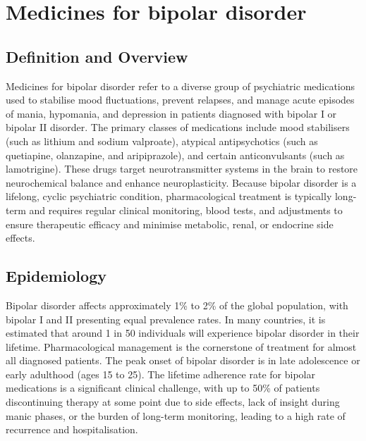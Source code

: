 \chapter{Medicines for bipolar disorder}

\section*{Definition and Overview}
Medicines for bipolar disorder refer to a diverse group of psychiatric medications used to stabilise mood fluctuations, prevent relapses, and manage acute episodes of mania, hypomania, and depression in patients diagnosed with bipolar I or bipolar II disorder. The primary classes of medications include mood stabilisers (such as lithium and sodium valproate), atypical antipsychotics (such as quetiapine, olanzapine, and aripiprazole), and certain anticonvulsants (such as lamotrigine). These drugs target neurotransmitter systems in the brain to restore neurochemical balance and enhance neuroplasticity. Because bipolar disorder is a lifelong, cyclic psychiatric condition, pharmacological treatment is typically long-term and requires regular clinical monitoring, blood tests, and adjustments to ensure therapeutic efficacy and minimise metabolic, renal, or endocrine side effects.

\section*{Epidemiology}
Bipolar disorder affects approximately 1\% to 2\% of the global population, with bipolar I and II presenting equal prevalence rates. In many countries, it is estimated that around 1 in 50 individuals will experience bipolar disorder in their lifetime. Pharmacological management is the cornerstone of treatment for almost all diagnosed patients. The peak onset of bipolar disorder is in late adolescence or early adulthood (ages 15 to 25). The lifetime adherence rate for bipolar medications is a significant clinical challenge, with up to 50\% of patients discontinuing therapy at some point due to side effects, lack of insight during manic phases, or the burden of long-term monitoring, leading to a high rate of recurrence and hospitalisation.

